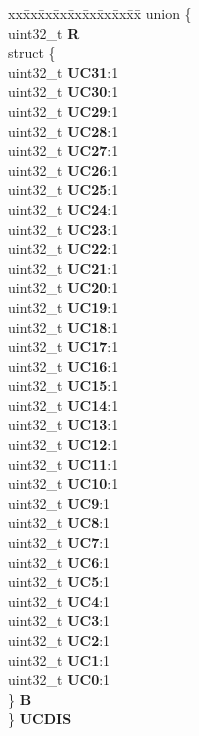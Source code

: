 \begin{DoxyCompactItemize}
\begin{tabbing}
\end{tabbing}\item 
\mbox{\label{structEMIOS__tag_aca98735890dd0e983ed4b69a0d58d93c}} 
\begin{tabbing}
xx\=xx\=xx\=xx\=xx\=xx\=xx\=xx\=xx\=\kill
union \{\\
\>uint32\_t {\bfseries R}\\
\>struct \{\\
\>\>uint32\_t {\bfseries UC31}:1\\
\>\>uint32\_t {\bfseries UC30}:1\\
\>\>uint32\_t {\bfseries UC29}:1\\
\>\>uint32\_t {\bfseries UC28}:1\\
\>\>uint32\_t {\bfseries UC27}:1\\
\>\>uint32\_t {\bfseries UC26}:1\\
\>\>uint32\_t {\bfseries UC25}:1\\
\>\>uint32\_t {\bfseries UC24}:1\\
\>\>uint32\_t {\bfseries UC23}:1\\
\>\>uint32\_t {\bfseries UC22}:1\\
\>\>uint32\_t {\bfseries UC21}:1\\
\>\>uint32\_t {\bfseries UC20}:1\\
\>\>uint32\_t {\bfseries UC19}:1\\
\>\>uint32\_t {\bfseries UC18}:1\\
\>\>uint32\_t {\bfseries UC17}:1\\
\>\>uint32\_t {\bfseries UC16}:1\\
\>\>uint32\_t {\bfseries UC15}:1\\
\>\>uint32\_t {\bfseries UC14}:1\\
\>\>uint32\_t {\bfseries UC13}:1\\
\>\>uint32\_t {\bfseries UC12}:1\\
\>\>uint32\_t {\bfseries UC11}:1\\
\>\>uint32\_t {\bfseries UC10}:1\\
\>\>uint32\_t {\bfseries UC9}:1\\
\>\>uint32\_t {\bfseries UC8}:1\\
\>\>uint32\_t {\bfseries UC7}:1\\
\>\>uint32\_t {\bfseries UC6}:1\\
\>\>uint32\_t {\bfseries UC5}:1\\
\>\>uint32\_t {\bfseries UC4}:1\\
\>\>uint32\_t {\bfseries UC3}:1\\
\>\>uint32\_t {\bfseries UC2}:1\\
\>\>uint32\_t {\bfseries UC1}:1\\
\>\>uint32\_t {\bfseries UC0}:1\\
\>\} {\bfseries B}\\
\} {\bfseries UCDIS}\\


\end{tabbing}
\end{DoxyCompactItemize}
